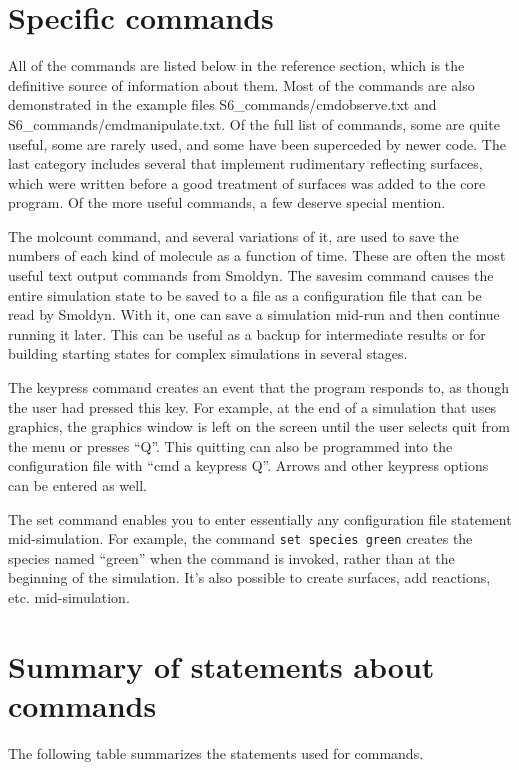 \documentclass {book}
\newcommand {\ttt} {\texttt}
\begin{document}
\section{Specific commands}

All of the commands are listed below in the reference section, which is the definitive source of information about them. Most of the commands are also demonstrated in the example files S6\_commands/cmdobserve.txt and S6\_commands/cmdmanipulate.txt. Of the full list of commands, some are quite useful, some are rarely used, and some have been superceded by newer code. The last category includes several that implement rudimentary reflecting surfaces, which were written before a good treatment of surfaces was added to the core program. Of the more useful commands, a few deserve special mention.

The molcount command, and several variations of it, are used to save the numbers of each kind of molecule as a function of time. These are often the most useful text output commands from Smoldyn.
The savesim command causes the entire simulation state to be saved to a file as a configuration file that can be read by Smoldyn. With it, one can save a simulation mid-run and then continue running it later. This can be useful as a backup for intermediate results or for building starting states for complex simulations in several stages.

The keypress command creates an event that the program responds to, as though the user had pressed this key. For example, at the end of a simulation that uses graphics, the graphics window is left on the screen until the user selects quit from the menu or presses ``Q''. This quitting can also be programmed into the configuration file with ``cmd a keypress Q''. Arrows and other keypress options can be entered as well.

The set command enables you to enter essentially any configuration file statement mid-simulation. For example, the command \ttt{set species green} creates the species named ``green'' when the command is invoked, rather than at the beginning of the simulation. It's also possible to create surfaces, add reactions, etc. mid-simulation.

\section{Summary of statements about commands}

The following table summarizes the statements used for commands.
\end{document}
